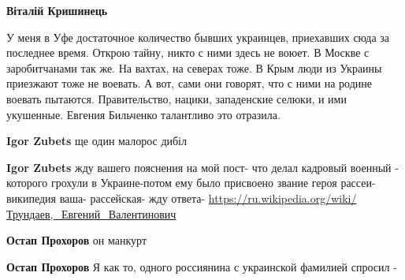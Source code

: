 \begin{itemize}
\begin{itemize}
 
\textbf{Віталій Кришинець} 

У меня в Уфе достаточное количество бывших украинцев, приехавших сюда за
последнее время. Открою тайну, никто с ними здесь не воюет. В Москве с
заробитчанами так же. На вахтах, на северах тоже. В Крым люди из Украины
приезжают тоже не воевать. А вот, сами они говорят, что с ними на родине
воевать пытаются. Правительство, нацики, западенские селюки, и ими укушенные.
Евгения Бильченко талантливо это отразила.

 
\textbf{Igor Zubets} ще один малорос дибіл

 
\textbf{Igor Zubets} жду вашего пояснения на мой пост- что делал кадровый
военный - которого грохули в Украине-потом ему было присвоено звание героя
рассеи- википедия ваша- рассейская- жду ответа-
\url{https://ru.wikipedia.org/wiki/Трундаев,_Евгений_Валентинович}

 
\textbf{Остап Прохоров} он манкурт

 
\textbf{Остап Прохоров}
Я как то, одного россиянина с украинской фамилией спросил -


\end{itemize}
\end{itemize}
